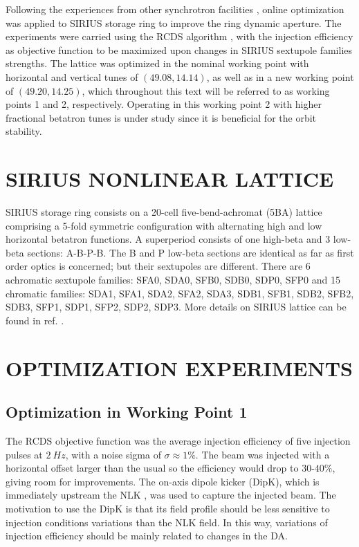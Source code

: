 \documentclass[a4paper,
               keeplastbox,   %
               ]{jacow}
\begin{document}
Following the experiences from other synchrotron facilities \cite{Huang:2015, Liuzzo:IPAC2016-THPMR015, Olsson:IPAC2018-WEPAL047, yang:ipac2022-tupopt064}, online optimization was applied to SIRIUS storage ring to improve the ring dynamic aperture. The experiments were carried using the RCDS algorithm \cite{Huang:2013}, with the injection efficiency as objective function to be maximized upon changes in SIRIUS sextupole families strengths. The lattice was optimized in the nominal working point with horizontal and vertical tunes of $(49.08, 14.14)$, as well as in a new working point of $(49.20, 14.25)$, which throughout this text will be referred to as working points 1 and 2, respectively. Operating in this working point 2 with higher fractional betatron tunes is under study since it is beneficial for the orbit stability.

\section{SIRIUS NONLINEAR LATTICE}
 SIRIUS storage ring consists on a 20-cell five-bend-achromat (5BA) lattice 
 comprising a 5-fold symmetric configuration with alternating high and low horizontal betatron functions. A superperiod consists of one high-beta and 3 low-beta sections: A-B-P-B. The B and P low-beta sections are identical as far as first order optics is concerned; but their sextupoles are different. There are 6 achromatic sextupole families: SFA0, SDA0, SFB0, SDB0, SDP0, SFP0 and 15 chromatic families: SDA1, SFA1, SDA2, SFA2, SDA3, SDB1, SFB1, SDB2, SFB2, SDB3, SFP1, SDP1, SFP2, SDP2, SDP3. More details on SIRIUS lattice can be found in ref. \cite{Liu:IPAC2016-THPMR013}.

\section{OPTIMIZATION EXPERIMENTS}

\subsection{Optimization in Working Point 1}
The RCDS objective function was the average injection efficiency of five injection pulses at $2~\unit{Hz}$, with a noise sigma of $\sigma \approx 1\%$. The beam was injected with a horizontal offset larger than the usual so the efficiency would drop to $30$-$40\%$, giving room for improvements. The on-axis dipole kicker (DipK), which is immediately upstream the NLK \cite{Liu:IPAC2016-THPMR011}, was used to capture the injected beam. The motivation to use the DipK is that its field profile should be less sensitive to injection conditions variations than the NLK field. In this way, variations of injection efficiency should be mainly related to changes in the DA.
\end{document}
